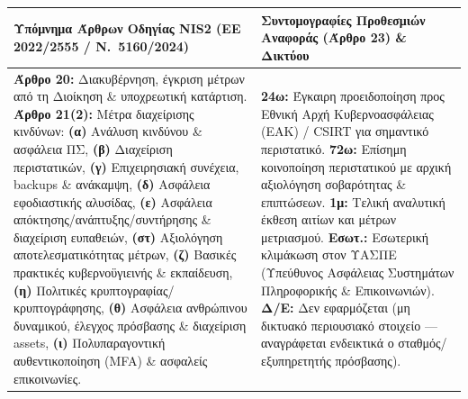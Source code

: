 \documentclass[10pt, a4paper]{article}
\begin{document}
\vspace{2pt}
{\fontsize{7.2pt}{9.2pt}\selectfont
\setlength{\tabcolsep}{5pt}
\renewcommand{\arraystretch}{1.15}
\begin{tabular}{|>{\RaggedRight\arraybackslash}p{155mm}|>{\RaggedRight\arraybackslash}p{111mm}|}
\hline
\rowcolor{rowalt}
\textbf{\color{primaryblue}Υπόμνημα Άρθρων Οδηγίας NIS2 (ΕΕ 2022/2555 / Ν.\ 5160/2024)} &
\textbf{\color{primaryblue}Συντομογραφίες Προθεσμιών Αναφοράς (Άρθρο 23) \& Δικτύου} \\
\hline
\textbf{Άρθρο 20:} Διακυβέρνηση, έγκριση μέτρων από τη Διοίκηση \& υποχρεωτική κατάρτιση.\newline
\textbf{Άρθρο 21(2):} Μέτρα διαχείρισης κινδύνων: \textbf{(α)} Ανάλυση κινδύνου \& ασφάλεια ΠΣ, \textbf{(β)} Διαχείριση περιστατικών, \textbf{(γ)} Επιχειρησιακή συνέχεια, backups \& ανάκαμψη, \textbf{(δ)} Ασφάλεια εφοδιαστικής αλυσίδας, \textbf{(ε)} Ασφάλεια απόκτησης/ανάπτυξης/συντήρησης \& διαχείριση ευπαθειών, \textbf{(στ)} Αξιολόγηση αποτελεσματικότητας μέτρων, \textbf{(ζ)} Βασικές πρακτικές κυβερνοϋγιεινής \& εκπαίδευση, \textbf{(η)} Πολιτικές κρυπτογραφίας/κρυπτογράφησης, \textbf{(θ)} Ασφάλεια ανθρώπινου δυναμικού, έλεγχος πρόσβασης \& διαχείριση assets, \textbf{(ι)} Πολυπαραγοντική αυθεντικοποίηση (MFA) \& ασφαλείς επικοινωνίες. &
\textbf{24ω:} Έγκαιρη προειδοποίηση προς Εθνική Αρχή Κυβερνοασφάλειας (ΕΑΚ) / CSIRT για σημαντικό περιστατικό.\newline
\textbf{72ω:} Επίσημη κοινοποίηση περιστατικού με αρχική αξιολόγηση σοβαρότητας \& επιπτώσεων.\newline
\textbf{1μ:} Τελική αναλυτική έκθεση αιτίων και μέτρων μετριασμού.\newline
\textbf{Εσωτ.:} Εσωτερική κλιμάκωση στον ΥΑΣΠΕ (Υπεύθυνος Ασφάλειας Συστημάτων Πληροφορικής \& Επικοινωνιών).\newline
\textbf{Δ/Ε:} Δεν εφαρμόζεται (μη δικτυακό περιουσιακό στοιχείο — αναγράφεται ενδεικτικά ο σταθμός/εξυπηρετητής πρόσβασης). \\
\hline
\end{tabular}
}
\end{document}
